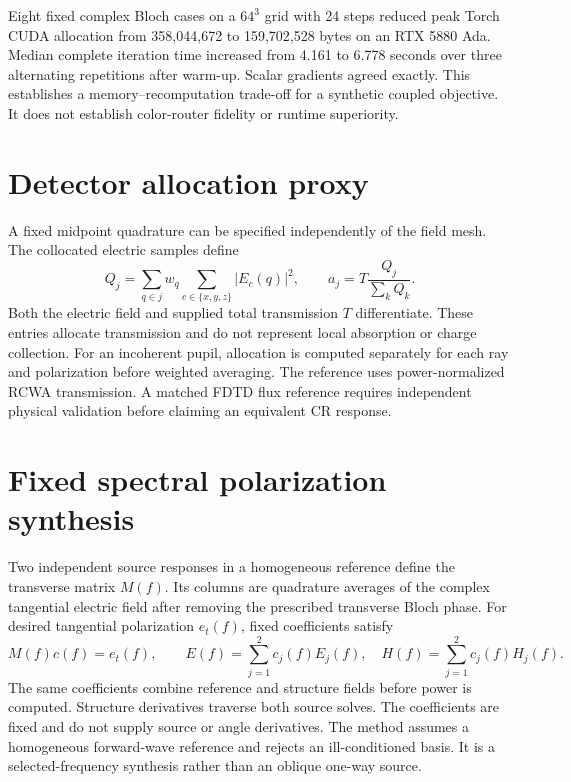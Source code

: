 \documentclass[11pt,a4paper]{article}
\begin{document}
Eight fixed complex Bloch cases on a $64^3$ grid with 24 steps reduced peak
Torch CUDA allocation from 358,044,672 to 159,702,528 bytes on an RTX 5880 Ada.
Median complete iteration time increased from 4.161 to 6.778 seconds over
three alternating repetitions after warm-up. Scalar gradients agreed exactly.
This establishes a memory--recomputation trade-off for a synthetic coupled
objective. It does not establish color-router fidelity or runtime superiority.

\section{Detector allocation proxy}
A fixed midpoint quadrature can be specified independently of the field mesh.
The collocated electric samples define
\[
Q_j=\sum_{q\in j} w_q \sum_{c\in\{x,y,z\}} |E_c(q)|^2,
\qquad a_j=T\frac{Q_j}{\sum_k Q_k}.
\]
Both the electric field and supplied total transmission $T$ differentiate.
These entries allocate transmission and do not represent local absorption or
charge collection. For an incoherent pupil, allocation is computed separately
for each ray and polarization before weighted averaging. The reference uses
power-normalized RCWA transmission. A matched FDTD flux reference requires
independent physical validation before claiming an equivalent CR response.

\section{Fixed spectral polarization synthesis}
Two independent source responses in a homogeneous reference define the
transverse matrix $M(f)$. Its columns are quadrature averages of the complex
tangential electric field after removing the prescribed transverse Bloch phase.
For desired tangential polarization $e_t(f)$, fixed coefficients satisfy
\[
M(f)c(f)=e_t(f),\qquad
E(f)=\sum_{j=1}^{2}c_j(f)E_j(f),\quad
H(f)=\sum_{j=1}^{2}c_j(f)H_j(f).
\]
The same coefficients combine reference and structure fields before power is
computed. Structure derivatives traverse both source solves. The coefficients
are fixed and do not supply source or angle derivatives. The method assumes a
homogeneous forward-wave reference and rejects an ill-conditioned basis.
It is a selected-frequency synthesis rather than an oblique one-way source.
\end{document}
